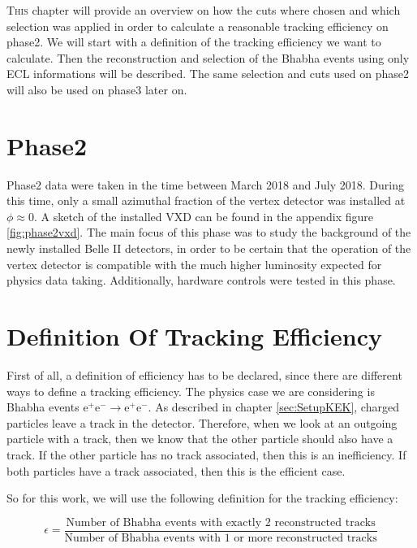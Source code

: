 \documentclass[a4paper,11pt,twosided,final,german,openbib,pdftex,listof=totoc,bibliography=totoc]{scrbook}
\begin{document}
\lettrine{T}{his} chapter will provide an overview on how the cuts where chosen and which selection was applied in order to calculate a reasonable tracking efficiency on phase2. We will start with a definition of the tracking efficiency we want to calculate. Then the reconstruction and selection of the Bhabha events using only ECL informations will be described. The same selection and cuts used on phase2 will also be used on phase3 later on.

\section{Phase2}
\label{sec:Phase2}

Phase2 data were taken in the time between March 2018 and July 2018. During this time, only a small azimuthal fraction of the vertex detector was installed at $\phi \approx 0$. A sketch of the installed VXD can be found in the appendix figure \ref{fig:phase2vxd}. The main focus of this phase was to study the background of the newly installed Belle II detectors, in order to be certain that the operation of the vertex detector is compatible with the much higher luminosity expected for physics data taking. Additionally, hardware controls were tested in this phase.


\section{Definition Of Tracking Efficiency}
\label{sec:Eff}

First of all, a definition of efficiency has to be declared, since there are different ways to define a tracking efficiency. The physics case we are considering is Bhabha events $ \textrm{e}^+ \textrm{e}^- \rightarrow \textrm{e}^+ \textrm{e}^- $. As described in chapter \ref{sec:SetupKEK}, charged particles leave a track in the detector. Therefore, when we look at an outgoing particle with a track, then we know that the other particle should also have a track. If the other particle has no track associated, then this is an inefficiency. If both particles have a track associated, then this is the efficient case.

So for this work, we will use the following definition for the tracking efficiency:

\begin{equation}
	\epsilon = \frac{\textrm{Number of Bhabha events with exactly 2 reconstructed tracks}}{\textrm{Number of Bhabha events with 1 or more reconstructed tracks}}
	\label{eq:efficiency}
\end{equation}
\end{document}
